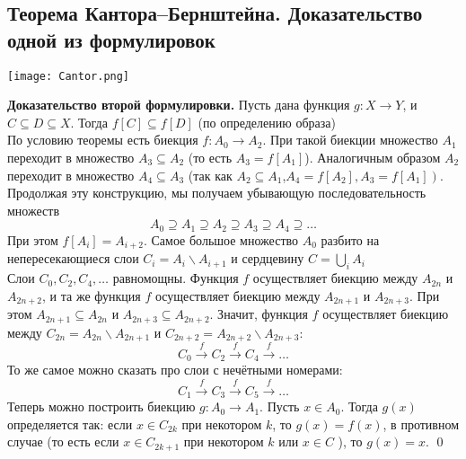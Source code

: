 \documentclass[a4paper]{article}
\begin{document}
\subsection{Теорема Кантора–Бернштейна. Доказательство одной из формулировок}
\begin{center}
    \texttt{[image: Cantor.png]}
\end{center}
\textbf{Доказательство второй формулировки.} Пусть дана функция $g: X \rightarrow Y$, и $C \subseteq D \subseteq X$. Тогда $f[C] \subseteq f[D]$ (по определению образа)\\[2mm]
 По условию теоремы есть биекция $f: A_{0} \rightarrow A_{2}$. При такой биекции множество $A_{1}$ переходит в множество $A_{3} \subseteq A_{2}$ (то есть $A_{3}=f\left[A_{1}\right]$). Аналогичным образом $A_{2}$ переходит в множество $A_{4} \subseteq A_{3}$ (так как $A_{2} \subseteq A_{1}$,$\left.A_{4}=f\left[A_{2}\right], A_{3}=f\left[A_{1}\right]\right)$. Продолжая эту конструкцию, мы получаем убывающую последовательность множеств\\[2mm]
$$
A_{0} \supseteq A_{1} \supseteq A_{2} \supseteq A_{3} \supseteq A_{4} \supseteq \ldots
$$
 При этом $f\left[A_{i}\right]=A_{i+2}$. Самое большое множество $A_{0}$ разбито на непересекающиеся слои $C_{i}=A_{i} \backslash A_{i+1}$ и сердцевину $C=\bigcup_{i} A_{i}$\\[2mm]
 Слои $C_{0}, C_{2}, C_{4}, \ldots$ равномощны. Функция $f$ осуществляет биекцию между $A_{2 n}$ и $A_{2 n+2}$, и та же функция $f$ осуществляет биекцию между $A_{2 n+1}$ и $A_{2 n+3}$. При этом $A_{2 n+1} \subseteq A_{2 n}$ и $A_{2 n+3} \subseteq A_{2 n+2}$. Значит, функция $f$ осуществляет биекцию между $C_{2 n}=A_{2 n} \backslash A_{2 n+1}$ и $C_{2 n+2}=A_{2 n+2} \backslash A_{2 n+3}$:
$$
C_{0} \stackrel{f}{\longrightarrow} C_{2} \stackrel{f}{\longrightarrow} C_{4} \stackrel{f}{\longrightarrow} \ldots
$$
 То же самое можно сказать про слои с нечётными номерами:
$$
C_{1} \stackrel{f}{\longrightarrow} C_{3} \stackrel{f}{\longrightarrow} C_{5} \stackrel{f}{\longrightarrow} \ldots
$$
 Теперь можно построить биекцию $g: A_{0} \rightarrow A_{1}$. Пусть $x \in A_{0}$. Тогда $g(x)$ определяется так: если $x \in C_{2 k}$ при некотором $k$, то $g(x)=f(x)$, в противном случае (то есть если $x \in C_{2 k+1}$ при некотором $k$ или $x \in C$ ), то $g(x)=x$. \qed
\end{document}
